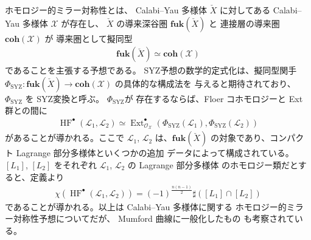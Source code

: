 \documentclass[uplatex,dvipdfmx,12pt]{jsarticle}
\numberwithin{equation}{section}
\theoremstyle{definition}
\newcommand{\opn}[1]{\operatorname{#1}}
\newcommand{\catn}[1]{\mathbf{#1}}
\begin{document}
ホモロジー的ミラー対称性とは、
Calabi--Yau 多様体 $\check{X}$ に対してある
Calabi--Yau 多様体 $\mathcal{X}$ が存在し、
$\check{X}$ の導来深谷圏 $\catn{fuk}(\check{X})$ と
連接層の導来圏 $\catn{coh}(\mathcal{X})$ が
導来圏として擬同型
\begin{align} \label{equation-hms}
\catn{fuk}(\check{X})\simeq \catn{coh}(\mathcal{X})
\end{align}
であることを主張する予想である。
SYZ予想の数学的定式化は、擬同型関手
$\Phi_{\opn{SYZ}}\colon \catn{fuk}(\check{X})
\to \catn{coh}(\mathcal{X})$ の具体的な構成法を
与えると期待されており、
$\Phi_{\opn{SYZ}}$ を SYZ変換と呼ぶ。
$\Phi_{\opn{SYZ}}$が
存在するならば、Floer コホモロジーと Ext 群との間に
\begin{align}
\opn{HF}^{\bullet}(\mathscr{L}_1,\mathscr{L}_2)
\simeq \opn{Ext}^{\bullet}_{\mathcal{O}_{\mathcal{X}}}(\Phi_{\opn{SYZ}}(\mathscr{L}_1),
\Phi_{\opn{SYZ}}(\mathscr{L}_2))
\end{align}
があることが導かれる。ここで
$\mathscr{L}_1$, $\mathscr{L}_2$ は、$\catn{fuk}(\check{X})$
の対象であり、コンパクト Lagrange 部分多様体といくつかの追加
データによって構成されている。$[L_1]$, $[L_2]$ をそれぞれ
$\mathscr{L}_1$, $\mathscr{L}_2$ の Lagrange 部分多様体
のホモロジー類だとすると、定義より
\begin{align}
\chi(\opn{HF}^{\bullet}(\mathscr{L}_1,\mathscr{L}_2))=
(-1)^{\frac{n(n-1)}{2}} \sharp ([L_1]\cap [L_2])
\end{align}
であることが導かれる。以上は Calabi--Yau 多様体に関する
ホモロジー的ミラー対称性予想についてだが、
Mumford 曲線に一般化したもの\cite{auroux2022lagrangian}
も考察されている。
\end{document}
